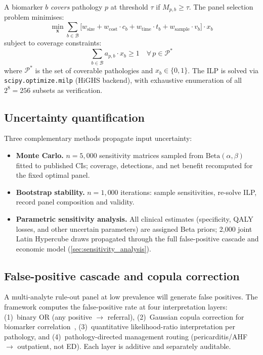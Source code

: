 \documentclass[11pt, oneside]{article}
\begin{document}
A biomarker $b$ \emph{covers} pathology $p$ at threshold $\tau$ if $M_{p,b} \geq \tau$. The panel selection problem minimises:
\begin{equation}
\min_{\mathbf{x}} \sum_{b \in \mathcal{B}} \Big[ w_{\text{size}} + w_{\text{cost}} \cdot c_b + w_{\text{time}} \cdot t_b + w_{\text{sample}} \cdot v_b \Big] \cdot x_b
\label{eq:objective}
\end{equation}
subject to coverage constraints:
\begin{equation}
\sum_{b \in \mathcal{B}} a_{p,b} \cdot x_b \geq 1 \quad \forall\, p \in \mathcal{P}^*
\label{eq:coverage}
\end{equation}
where $\mathcal{P}^*$ is the set of coverable pathologies and $x_b \in \{0,1\}$. The ILP is solved via \texttt{scipy.optimize.milp} (HiGHS backend), with exhaustive enumeration of all $2^8 = 256$ subsets as verification.

\subsection{Uncertainty quantification}

Three complementary methods propagate input uncertainty:
\begin{itemize}
\item \textbf{Monte Carlo.} $n = 5{,}000$ sensitivity matrices sampled from $\text{Beta}(\alpha, \beta)$ fitted to published CIs; coverage, detections, and net benefit recomputed for the fixed optimal panel.
\item \textbf{Bootstrap stability.} $n = 1{,}000$ iterations: sample sensitivities, re-solve ILP, record panel composition and validity.
\item \textbf{Parametric sensitivity analysis.} All clinical estimates (specificity, QALY losses, and other uncertain parameters) are assigned Beta priors; 2{,}000 joint Latin Hypercube draws propagated through the full false-positive cascade and economic model (\cref{sec:sensitivity_analysis}).
\end{itemize}

\subsection{False-positive cascade and copula correction}

A multi-analyte rule-out panel at low prevalence will generate false positives. The framework computes the false-positive rate at four interpretation layers: (1)~binary OR (any positive $\to$ referral), (2)~Gaussian copula correction for biomarker correlation~\cite{Nelsen2006}, (3)~quantitative likelihood-ratio interpretation per pathology, and (4)~pathology-directed management routing (pericarditis/AHF $\to$ outpatient, not ED). Each layer is additive and separately auditable.
\end{document}
